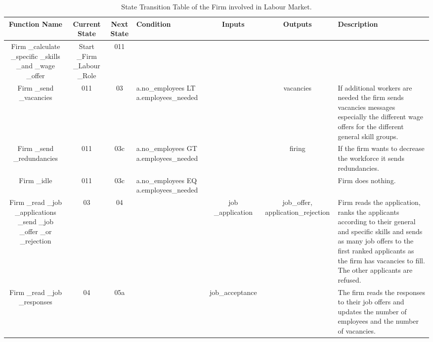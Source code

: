 \begin{landscape}
\begin{table}[!htb]\caption{State Transition Table of the Firm involved in Labour Market.}
\begin{center}
\begin{tabular}{|c|c|c|l|c|c|l|}
\hline
Function Name & Current State & Next State & Condition & Inputs & Outputs & Description \\
\hline
{\parbox[l]{3cm}{Firm \_calculate \_specific \_skills \_and
\_wage \_offer}}& {\parbox[l]{3cm}{Start \_Firm \_Labour \_Role}}&
{\parbox[l]{3cm}{011}}&
 & & &
\\
\hline

{\parbox[l]{3cm}{Firm \_send \_vacancies}}& {\parbox[l]{3cm}{011}}&
{\parbox[l]{3cm}{03}}& {\parbox[l]{3cm}{a.no\_employees LT
a.employees\_needed}}& & {\parbox[l]{3cm}{vacancies}}&
{\parbox[l]{3cm}{If additional workers are needed the firm sends
vacancies messages
 especially the different wage offers for the different general skill groups.}}\\
\hline

{\parbox[l]{3cm}{Firm \_send \_redundancies}}&
{\parbox[l]{3cm}{011}}& {\parbox[l]{3cm}{03c}}&
{\parbox[l]{3cm}{a.no\_employees GT a.employees\_needed}} &
 &{\parbox[l]{3cm}{firing}} & {\parbox[l]{3cm}{If the firm wants to
decrease the workforce it sends redundancies.}}
\\
\hline

{\parbox[l]{3cm}{Firm \_idle}}& {\parbox[l]{3cm}{011}}&
{\parbox[l]{3cm}{03c}}&{\parbox[l]{3cm}{a.no\_employees EQ
a.employees\_needed}}
 & & &{\parbox[l]{3cm}{Firm does nothing.}}
\\
\hline

{\parbox[l]{3cm}{Firm \_read \_job \_applications \_send \_job
\_offer \_or \_rejection}}& {\parbox[l]{3cm}{03}}&
{\parbox[l]{3cm}{04}}& &{\parbox[l]{3cm}{job \_application}}&
{\parbox[l]{3cm}{job\_offer,
application\_rejection}}&{\parbox[l]{3cm}{Firm reads the
application, ranks the applicants according to their general and
specific skills and sends as many job offers to the first ranked
applicants as the firm has vacancies to fill. The other applicants
are refused.}}
\\
\hline


{\parbox[l]{3cm}{Firm \_read \_job \_responses}}&
{\parbox[l]{3cm}{04}}& {\parbox[l]{3cm}{05a}}& &
{\parbox[l]{3cm}{job\_acceptance}}&&{\parbox[l]{3cm}{The firm reads
the responses to their job offers and updates the number of
employees and the number of vacancies.}}
\\




\end{tabular}
\end{center}
\end{table}
\end{landscape}
